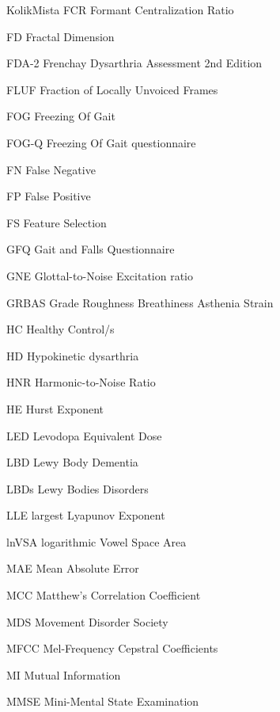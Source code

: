 \begin{seznamzkratek}{KolikMista}
		{FCR}
		{Formant Centralization Ratio}

		{FD}
		{Fractal Dimension}

		{FDA-2}
		{Frenchay Dysarthria Assessment 2nd Edition}

		{FLUF}
		{Fraction of Locally Unvoiced Frames}

		{FOG}
		{Freezing Of Gait}

		{FOG-Q}
		{Freezing Of Gait questionnaire}

		{FN}
		{False Negative}

		{FP}
		{False Positive}

		{FS}
		{Feature Selection}

		{GFQ}
		{Gait and Falls Questionnaire}

		{GNE}
		{Glottal-to-Noise Excitation ratio}

		{GRBAS}
		{Grade Roughness Breathiness Asthenia Strain}

		{HC}
		{Healthy Control/s}

		{HD}
		{Hypokinetic dysarthria}

		{HNR}
		{Harmonic-to-Noise Ratio}

		{HE}
		{Hurst Exponent}

		{LED}
		{Levodopa Equivalent Dose}

		{LBD}
		{Lewy Body Dementia}

		{LBDs}
		{Lewy Bodies Disorders}

		{LLE}
		{largest Lyapunov Exponent}

		{lnVSA}
		{logarithmic Vowel Space Area}

		{MAE}
		{Mean Absolute Error}

		{MCC}
		{Matthew's Correlation Coefficient}

		{MDS}
		{Movement Disorder Society}

		{MFCC}
		{Mel-Frequency Cepstral Coefficients}

		{MI}
		{Mutual Information}

		{MMSE}
		{Mini-Mental State Examination}


\end{seznamzkratek}
